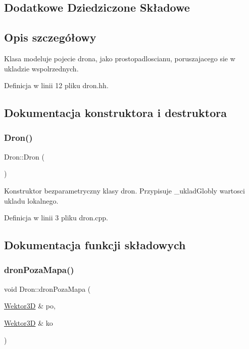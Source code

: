 \subsection*{Dodatkowe Dziedziczone Składowe}


\subsection{Opis szczegółowy}
Klasa modeluje pojecie drona, jako prostopadloscianu, poruszajacego sie w ukladzie wspolrzednych. 

Definicja w linii 12 pliku dron.\+hh.



\subsection{Dokumentacja konstruktora i destruktora}
\mbox{\label{class_dron_ae9b8a464e28bef5d688f49f7d9443fed}} 
\subsubsection{\texorpdfstring{Dron()}{Dron()}}
{\footnotesize\ttfamily Dron\+::\+Dron (\begin{DoxyParamCaption}{ }\end{DoxyParamCaption})}

Konstruktor bezparametryczny klasy dron. Przypisuje \+\_\+uklad\+Globly wartosci ukladu lokalnego. 

Definicja w linii 3 pliku dron.\+cpp.



\subsection{Dokumentacja funkcji składowych}
\mbox{\label{class_dron_a0ae898c60e73e6f2a7c75322f243c1d5}} 
\subsubsection{\texorpdfstring{dronPozaMapa()}{dronPozaMapa()}}
{\footnotesize\ttfamily void Dron\+::dron\+Poza\+Mapa (\begin{DoxyParamCaption}\item[{\mbox{\hyperlink{class_wektor3_d}{Wektor3D}} \&}]{po,  }\item[{\mbox{\hyperlink{class_wektor3_d}{Wektor3D}} \&}]{ko }\end{DoxyParamCaption})}

